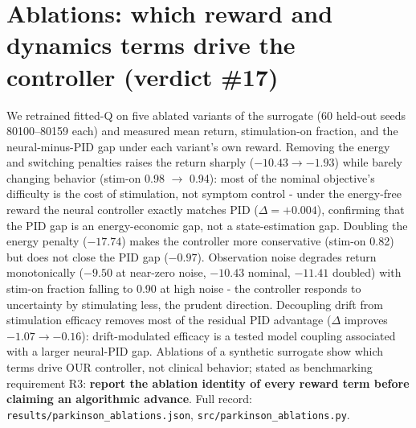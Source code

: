 \section{Ablations: which reward and dynamics terms drive the controller (verdict \#17)}
We retrained fitted-Q on five ablated variants of the surrogate (60 held-out seeds 80100--80159 each) and measured mean return, stimulation-on fraction, and the neural-minus-PID gap under each variant's own reward. Removing the energy and switching penalties raises the return sharply ($-10.43 \to -1.93$) while barely changing behavior (stim-on 0.98 $\to$ 0.94): most of the nominal objective's difficulty is the cost of stimulation, not symptom control - under the energy-free reward the neural controller exactly matches PID ($\Delta = +0.004$), confirming that the PID gap is an energy-economic gap, not a state-estimation gap. Doubling the energy penalty ($-17.74$) makes the controller more conservative (stim-on 0.82) but does not close the PID gap ($-0.97$). Observation noise degrades return monotonically ($-9.50$ at near-zero noise, $-10.43$ nominal, $-11.41$ doubled) with stim-on fraction falling to 0.90 at high noise - the controller responds to uncertainty by stimulating less, the prudent direction. Decoupling drift from stimulation efficacy removes most of the residual PID advantage ($\Delta$ improves $-1.07 \to -0.16$): drift-modulated efficacy is a tested model coupling associated with a larger neural-PID gap. Ablations of a synthetic surrogate show which terms drive OUR controller, not clinical behavior; stated as benchmarking requirement R3: \textbf{report the ablation identity of every reward term before claiming an algorithmic advance}. Full record: \texttt{results/parkinson\_ablations.json}, \texttt{src/parkinson\_ablations.py}.


